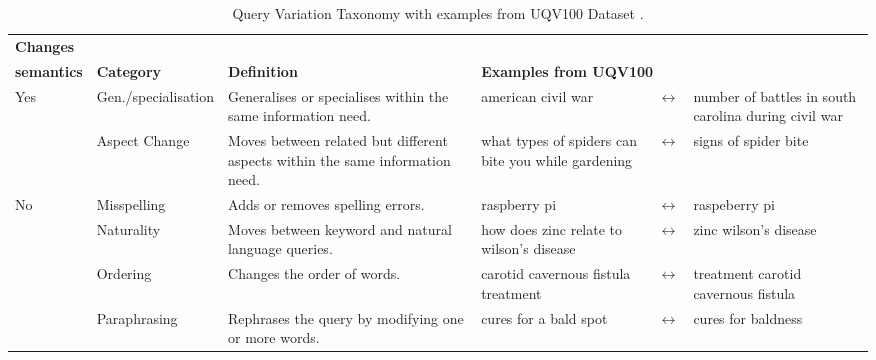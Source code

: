 \begin{table}[h]
\centering
\caption{Query Variation Taxonomy with examples from UQV100 Dataset \cite{penha2022}.}
\label{tab:var-types}
\begin{tabularx}{\columnwidth}{l|l|X|XcX}

\textbf{Changes}\\\textbf{semantics} & \textbf{Category} & \textbf{Definition} & \multicolumn{3}{l}{\textbf{Examples from UQV100}} \\ \hline
\multirow{2}{*}{Yes} & Gen./specialisation & Generalises or specialises within the same information need. & american civil war & $ \leftrightarrow $ & number of battles in south carolina during civil war \\ \cline{2-6} 
 & Aspect Change & Moves between related but different aspects within the same information need. & what types of spiders can bite you while gardening & $ \leftrightarrow $ & {signs of spider bite} \\ \hline
\multirow{4}{*}{No} & Misspelling & Adds or removes spelling errors. & raspberry pi & $ \leftrightarrow $ & raspeberry pi \\ \cline{2-6} 
 & Naturality & Moves between keyword and natural language queries. & how does zinc relate to wilson’s disease & $ \leftrightarrow $ & {zinc wilson’s disease} \\ \cline{2-6} 
 & Ordering & Changes the order of words. & carotid cavernous fistula treatment & $ \leftrightarrow $ & treatment carotid cavernous fistula \\ \cline{2-6} 
 & Paraphrasing & Rephrases the query by modifying one or more words. & cures for a bald spot & $ \leftrightarrow $ & cures for baldness \\ \hline
 
\end{tabularx}
\end{table}